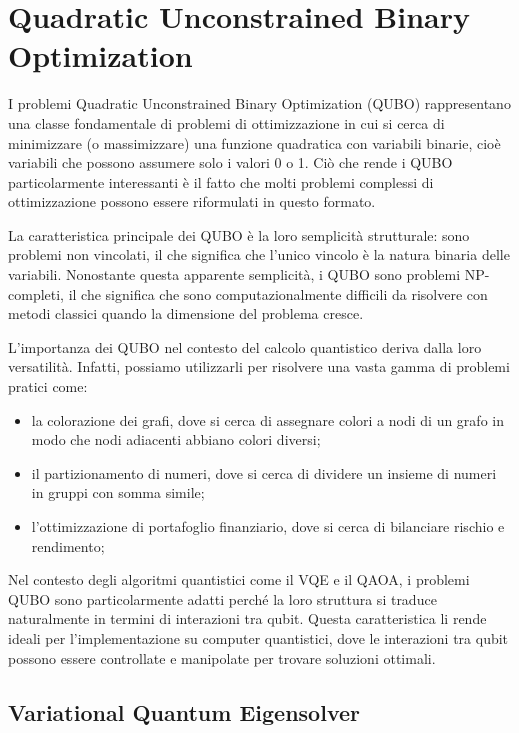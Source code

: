 \section{Quadratic Unconstrained Binary Optimization}\label{sec:algoritmi}

I problemi Quadratic Unconstrained Binary Optimization (QUBO) rappresentano una 
classe fondamentale di problemi di ottimizzazione in cui si cerca di minimizzare 
(o massimizzare) una funzione quadratica con variabili binarie, cioè variabili 
che possono assumere solo i valori 0 o 1. Ciò che rende i QUBO particolarmente 
interessanti è il fatto che molti problemi complessi di ottimizzazione possono 
essere riformulati in questo formato.

La caratteristica principale dei QUBO è la loro semplicità strutturale: sono 
problemi non vincolati, il che significa che l'unico vincolo è la natura binaria 
delle variabili. Nonostante questa apparente semplicità, i QUBO sono problemi 
NP-completi, il che significa che sono computazionalmente difficili da risolvere 
con metodi classici quando la dimensione del problema cresce.

L'importanza dei QUBO nel contesto del calcolo quantistico deriva dalla loro 
versatilità. Infatti, possiamo utilizzarli per risolvere una vasta gamma di 
problemi pratici come:

\begin{itemize}
    \item la colorazione dei grafi, dove si cerca di assegnare colori a nodi di 
        un grafo in modo che nodi adiacenti abbiano colori diversi;
    \item il partizionamento di numeri, dove si cerca di dividere un insieme di 
        numeri in gruppi con somma simile;
    \item l'ottimizzazione di portafoglio finanziario, dove si cerca di bilanciare 
        rischio e rendimento;
\end{itemize}

Nel contesto degli algoritmi quantistici come il VQE e il QAOA, i problemi QUBO sono 
particolarmente adatti perché la loro struttura si traduce naturalmente in termini 
di interazioni tra qubit. Questa caratteristica li rende ideali per 
l'implementazione su computer quantistici, dove le interazioni tra qubit possono 
essere controllate e manipolate per trovare soluzioni ottimali.



\subsection{Variational Quantum Eigensolver}\label{sec:vqe}

